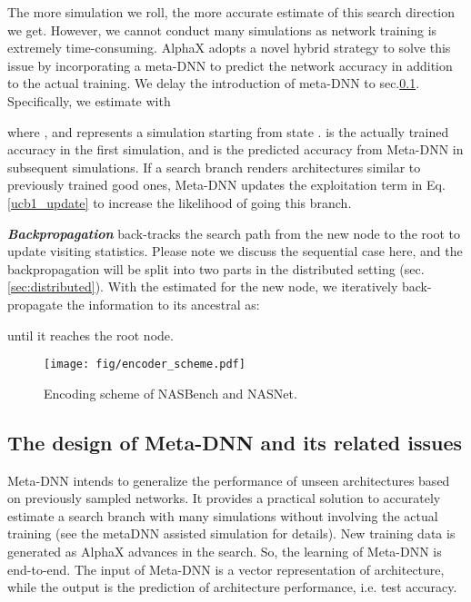 \documentclass[10pt,twocolumn,letterpaper]{article}
\begin{document}
The more simulation we roll, the more accurate estimate of this search direction we get. However, we cannot conduct many simulations as network training is extremely time-consuming.
AlphaX adopts a novel hybrid strategy to solve this issue by incorporating a meta-DNN to predict the network accuracy in addition to the actual training. We delay the introduction of meta-DNN to sec.\ref{sec:metadnn}.
Specifically, we estimate  with

where , and  represents a simulation starting from state .  is the actually trained accuracy in the first simulation, and  is the predicted accuracy from Meta-DNN in subsequent  simulations. If a search branch renders architectures similar to previously trained good ones, Meta-DNN updates the exploitation term in Eq.\ref{ucb1_update} to increase the likelihood of going this branch.



\textbf{\textit{Backpropagation}} back-tracks the search path from the new node to the root to update visiting statistics. Please note we discuss the sequential case here, and the backpropagation will be split into two parts in the distributed setting (sec.\ref{sec:distributed}). 
With the estimated  for the new node, we iteratively back-propagate the information to its ancestral as:

until it reaches the root node.




\begin{figure}
\vspace{-0.2in}
\centering 
\texttt{[image: fig/encoder\_scheme.pdf]}
\caption{Encoding scheme of NASBench and NASNet.}
\label{fig:network-encoding}
\end{figure}

\subsection{The design of Meta-DNN and its related issues}
\label{sec:metadnn}

Meta-DNN intends to generalize the performance of unseen architectures based on previously sampled networks. It provides a practical solution to accurately estimate a search branch with many simulations without involving the actual training (see the metaDNN assisted simulation for details). New training data is generated as AlphaX advances in the search. So, the learning of Meta-DNN is end-to-end. The input of Meta-DNN is a vector representation of architecture, while the output is the prediction of architecture performance, i.e. test accuracy. 
\end{document}
